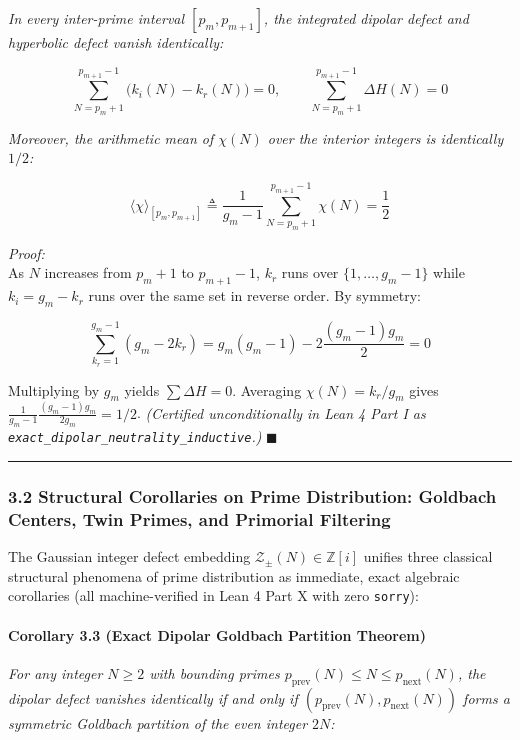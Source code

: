 \documentclass[
  11pt,
]{article}
\begin{document}
\emph{In every inter-prime interval \([p_m, p_{m+1}]\), the integrated
dipolar defect and hyperbolic defect vanish identically:}

\[\sum_{N = p_m + 1}^{p_{m+1} - 1} \big(k_i(N) - k_r(N)\big) = 0, \qquad \sum_{N = p_m + 1}^{p_{m+1} - 1} \Delta H(N) = 0\]

\emph{Moreover, the arithmetic mean of \(\chi(N)\) over the interior
integers is identically \(1/2\):}

\[\langle \chi \rangle_{[p_m, p_{m+1}]} \triangleq \frac{1}{g_m - 1}\sum_{N = p_m + 1}^{p_{m+1} - 1} \chi(N) = \frac{1}{2}\]

\emph{Proof:}\\
As \(N\) increases from \(p_m + 1\) to \(p_{m+1} - 1\), \(k_r\) runs
over \(\{1, \dots, g_m - 1\}\) while \(k_i = g_m - k_r\) runs over the
same set in reverse order. By symmetry:

\[\sum_{k_r=1}^{g_m-1} (g_m - 2k_r) = g_m(g_m - 1) - 2 \frac{(g_m - 1)g_m}{2} = 0\]

Multiplying by \(g_m\) yields \(\sum \Delta H = 0\). Averaging
\(\chi(N) = k_r/g_m\) gives
\(\frac{1}{g_m - 1} \frac{(g_m-1)g_m}{2 g_m} = 1/2\). \emph{(Certified
unconditionally in Lean 4 Part I as
\texttt{exact\_dipolar\_neutrality\_inductive}.)} \(\blacksquare\)

\begin{center}\rule{0.5\linewidth}{0.5pt}\end{center}

\subsubsection{3.2 Structural Corollaries on Prime Distribution:
Goldbach Centers, Twin Primes, and Primorial
Filtering}\label{structural-corollaries-on-prime-distribution-goldbach-centers-twin-primes-and-primorial-filtering}

The Gaussian integer defect embedding
\(\mathcal{Z}_\pm(N) \in \mathbb{Z}[i]\) unifies three classical
structural phenomena of prime distribution as immediate, exact algebraic
corollaries (all machine-verified in Lean 4 Part X with zero
\texttt{sorry}):

\paragraph{Corollary 3.3 (Exact Dipolar Goldbach Partition
Theorem)}\label{corollary-3.3-exact-dipolar-goldbach-partition-theorem}

\emph{For any integer \(N \ge 2\) with bounding primes
\(p_{\text{prev}}(N) \le N \le p_{\text{next}}(N)\), the dipolar defect
vanishes identically if and only if
\((p_{\text{prev}}(N), p_{\text{next}}(N))\) forms a symmetric Goldbach
partition of the even integer \(2N\):}
\end{document}

